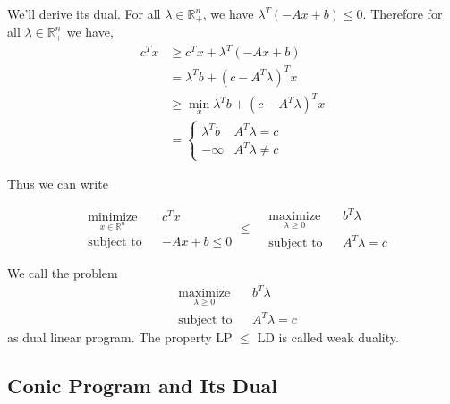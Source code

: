 \documentclass[a4paper,11pt]{article}
\newcommand{\Rn}{\mathbb{R}^n}
\begin{document}
We'll derive its dual. For all $\lambda \in \Rn_+$,  we have $\lambda^T(-Ax + b) \leq 0$. Therefore for all $\lambda \in \Rn_+$ we have,
\begin{align*}
c^Tx  &\geq  c^Tx  + \lambda^T(-Ax + b) \\
	  &= \lambda^T b + (c - A^T \lambda)^Tx\\
	  & \geq \min_{x}\lambda^T b + (c - A^T \lambda)^Tx\\
	  & = \begin{cases} 
		      \lambda^T b   & A^T \lambda = c \\
		      -\infty 		& A^T \lambda \neq c 
		   \end{cases}
\end{align*}

Thus we can write 

\begin{equation*}
\begin{aligned}
& \underset{x\in \Rn}{\text{minimize}}
& & c^Tx \\
& \text{subject to}
& & -Ax + b \leq 0 
\end{aligned}
\leq 
\begin{aligned}
& \underset{\lambda\geq 0}{\text{maximize}}
& & b^T\lambda \\
& \text{subject to}
& & A^T\lambda = c 
\end{aligned}
\end{equation*}

We call the problem 
\begin{equation}
\begin{aligned}
& \underset{\lambda\geq 0}{\text{maximize}}
& & b^T\lambda \\
& \text{subject to}
& & A^T\lambda = c 
\end{aligned}
\tag{LD}
\end{equation}
as dual linear program. The property LP $\leq$ LD is called weak duality.

\subsection{Conic Program and Its Dual}
\end{document}
